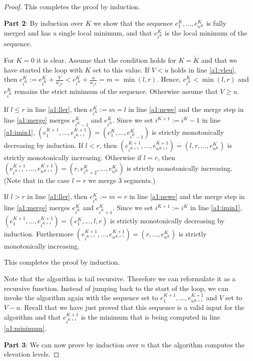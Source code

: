 \documentclass[11pt,a4paper]{article}
\begin{document}
\begin{proof}
This completes the proof by induction.

\textbf{Part 2}: By induction over $K$ we show that the sequence $e_1^K,\ldots,e_{n^K}^K$ is fully merged and has a single local minimum, and that $e_{i^K}^K$ is the local minimum of the sequence.

For $K=0$ it is clear.
Assume that the condition holds for $K = \tilde{K}$ and that we have started the loop with $K$ set to this value.
If $V < u$ holds in line \ref{a1:vleu}, then $e_{i^K}^K := e_{i^K}^K + \frac{V}{w_{i^K}} < e_{i^K}^K + \frac{u}{w_{i^K}} = m = \min(l, r)$.
Hence, $e_{i^K}^K < \min(l, r)$ and $e_{i^K}^K$ remains the strict minimum of the sequence.
Otherwise assume that $V \ge u$.

If $l \le r$ in line \ref{a1:ller}, then $e_{i^K}^K := m = l$ in line \ref{a1:newe} and the merge step in line \ref{a1:merge} merges $e_{i^K - 1}^K$ and $e_{i^K}^K$.
Since we set $i^{K+1} := i^K - 1$ in line \ref{a1:imin1},
$(e_1^{K+1},\ldots,e_{i^{K+1}}^{K+1}) = (e_1^K,\ldots,e_{i^K - 1}^K)$ is strictly monotonically decreasing by induction.
If $l < r$, then $(e_{i^{K+1}}^{K+1},\ldots,e_{n^{K+1}}^{K+1}) = (l,r,\ldots,e_{n^K}^K)$ is strictly monotonically increasing.
Otherwise if $l = r$, then $(e_{i^{K+1}}^{K+1},\ldots,e_{n^{K+1}}^{K+1}) = (r,e_{i^K+2}^K,\ldots,e_{n^K}^K)$ is strictly monotonically increasing.
(Note that in the case $l = r$ we merge 3 segments.)

If $l > r$ in line \ref{a1:ller}, then $e_{i^K}^K := m = r$ in line \ref{a1:newe} and the merge step in line \ref{a1:merge} merges $e_{i^K}^K$ and $e_{i^K + 1}^K$.
Since we set $i^{K+1} := i^K$ in line \ref{a1:imin1},
$(e_1^{K+1},\ldots,e_{i^{K+1}}^{K+1}) = (e_1^K,\ldots,l,r)$ is strictly monotonically decreasing by induction.
Furthermore $(e_{i^{K+1}}^{K+1},\ldots,e_{n^{K+1}}^{K+1}) = (r,\ldots,e_{n^K}^K)$ is strictly monotonically increasing.

This completes the proof by induction.

Note that the algorithm is tail recursive.
Therefore we can reformulate it as a recursive function.
Instead of jumping back to the start of the loop, we can invoke the algorithm again with
the sequence set to $e_1^{K+1},\ldots,e_{n^{K+1}}^{K+1}$ and $V$ set to $V - u$.
Recall that we have just proved that this sequence is a valid input for the algorithm and that $e_{i^{K+1}}^{K+1}$ is the minimum that is being computed in line \ref{a1:minimum}.

\textbf{Part 3}: We can now prove by induction over $n$ that the algorithm computes the elevation levels.


\end{proof}
\end{document}
